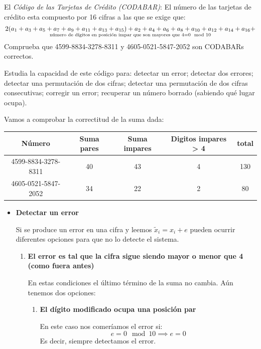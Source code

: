 \begin{problem}[5] El {\it Código de las Tarjetas de Crédito (CODABAR)}: El
número de las tarjetas de crédito esta compuesto por 16 cifras a
las que se exige que:
\small
\[2(a_1+a_3+a_5+a_7+a_9+a_{11}+a_{13}+a_{15})
+a_2+a_4+a_6+a_8+a_{10}+ a_{12}+a_{14}+a_{16}+ \atop
\text{número de dígitos en posición impar que son mayores que
4}=0 \mod 10\]
\normalsize
\ppart Comprueba que 4599-8834-3278-8311 y 4605-0521-5847-2052 son
CODABARs correctos.

\ppart Estudia la capacidad de este código para: detectar un error;
detectar dos errores; detectar una permutación de dos cifras;
detectar una permutación de dos cifras consecutivas; corregir un
error; recuperar un número borrado (sabiendo qué lugar ocupa).
\solution


\spart

Vamos a comprobar la correctitud de la suma dada:
\begin{center}
\begin{tabular}{|c|c|c|c|c|}
\hline
Número & Suma pares & Suma impares & Digitos impares > 4 & total \\
\hline
\hline
4599-8834-3278-8311 & 40 & 43 & 4 & 130 \\
\hline
4605-0521-5847-2052 & 34 & 22 & 2 & 80 \\
\hline
\end{tabular}
\end{center}

\spart

\begin{itemize}
\item \textbf{Detectar un error}

Si se produce un error en una cifra y leemos $\tilde{x}_i = x_i+e$ pueden ocurrir diferentes opciones para que no lo detecte el sistema.

\begin{enumerate}
\item \textbf{El error es tal que la cifra sigue siendo mayor o menor que 4 (como fuera antes)}

En estas condiciones el último término de la suma no cambia. Aún tenemos dos opciones:
\begin{enumerate}
\item \textbf{El dígito modificado ocupa una posición par}

En este caso nos comeríamos el error si:
\[e=0 \mod 10 \implies e=0\]
Es decir, siempre detectamos el error.


\end{enumerate}
\end{enumerate}
\end{itemize}
\end{problem}
